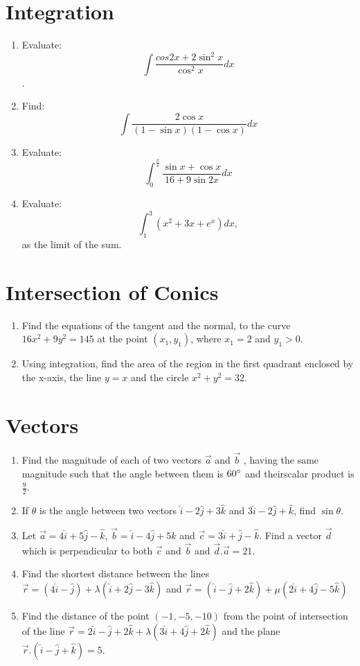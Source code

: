 \documentclass{article}
\providecommand{\brak}[1]{\ensuremath{\left(#1\right)}}
\begin{document}
\section{Integration}
\begin{enumerate}
\item Evaluate: \[\int \frac{cos 2x + 2\sin^{2} x}{\cos^{2}x} dx\].	
\item Find: \[ \int \frac{2\cos x}{\brak{1-\sin x}\brak{1-\cos x}}dx \]
\item Evaluate:
	\[ \int_{0}^{\frac{\pi}{4}}\frac{\sin x + \cos x}{16 + 9 \sin 2x}dx \]
\item Evaluate:
	\[\int_{1}^{3} \brak{x^2 + 3x + e^x}dx, \]  as the limit of the sum.
\end{enumerate}
\section{Intersection of Conics}
\begin{enumerate}
\item Find the equations of the tangent and the normal, to the curve $16x^{2}+9y^{2}=145$ at the point $\brak{x_{1},y_{1}}$, where $x_{1}=2$ and $y_{1}>0$.
\item Using integration, find the area of the region in the first quadrant enclosed by the x-axis, the line $y = x$ and the circle $x^{2}+y^{2} = 32.$
\end{enumerate}
\section{Vectors}
\begin{enumerate}
\item Find the magnitude of each of two vectors $\vec{a}$ and $\vec{b}$ , having the same magnitude such that the angle  between them is $60\degree{}$ and theirscalar product is $\frac{9}{2}$.
\item If $\theta$ is the angle between two vectors $\hat{i}-2\hat{j}+3\hat{k}$ and $3\hat{i}-2\hat{j}+\hat{k}$, find $\sin\theta$.
\item Let $\vec{a}=4\hat{i}+5\hat{j}-\hat{k}$, $\vec{b}=\hat{i}-4\hat{j}+5\hat{k}$ and $\vec{c}=3\hat{i}+\hat{j}-\hat{k}$. Find a vector $\vec{d}$ which is perpendicular to both $\vec{c}$ and $\vec{b}$ and $\vec{d}.\vec{a}=21$.
\item Find the shortest distance between the lines \\ $\vec{r} = \brak{4\hat{i}-\hat{j}}+\lambda\brak{\hat{i}+2\hat{j}-3\hat{k}}$ and $\vec{r} = \brak{\hat{i}-\hat{j}+2\hat{k}}+ \mu\brak{2\hat{i}+4\hat{j}-5\hat{k}}$
\item Find the distance of the point \brak{-1,-5,-10} from the point of intersection of the line $\vec{r}=2\hat{i}-\hat{j}+2\hat{k}+\lambda{\brak{3\hat{i}+4\hat{j}+2\hat{k}}}$ and the plane $\vec{r}.\brak{\hat{i}-\hat{j}+\hat{k}}=5.$
\end{enumerate}
\end{document}
